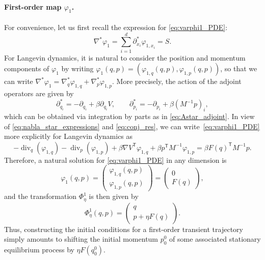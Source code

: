 \documentclass[11pt]{article}
\renewcommand{\t}{\mathsf T}
\DeclareMathOperator{\Div}{div}
\theoremstyle{definition}
\let\oldparagraph=\paragraph
\renewcommand\paragraph[1]{\oldparagraph{#1.}}
\begin{document}
\paragraph{First-order map $\varphi_1$} For convenience, let us first recall the expression for \eqref{eq:varphi1_PDE}: \begin{equation}
	\nabla^*\varphi_1 = \sum_{i=1}^d \partial_{x_i}^* \varphi_{1,x_i} = S.
 \end{equation}
For Langevin dynamics, it is natural to consider the position and momentum components of $\varphi_1$ by writing $\varphi_1(q,p) = (\varphi_{1,q}(q,p), \varphi_{1,p}(q,p))$, so that we can write $\nabla^*\varphi_1 = \nabla^*_q\varphi_{1,q} + \nabla^*_p\varphi_{1,p}$. More precisely, the action of the adjoint operators are given by
\begin{equation}
	\partial^*_{q_i} = - \partial_{q_i} + \beta\partial_{q_i} V , \qquad \partial^*_{p_i} = - \partial_{p_i} + \beta (M^{-1}p)_i,
	\label{eq:nabla_star_expressions}
\end{equation}
which can be obtained via integration by parts as in \eqref{eq:Astar_adjoint}. In view of \eqref{eq:nabla_star_expressions} and \eqref{eq:conj_res}, we can write~\eqref{eq:varphi1_PDE} more explicitly for Langevin dynamics as
\begin{equation}
	-\Div_q(\varphi_{1,q}) - \Div_p(\varphi_{1,p}) + \beta \nabla V^\t \varphi_{1,q} + \beta p^\t M^{-1} \varphi_{1,p} = \beta F(q)^\t M^{-1} p.
\end{equation}
Therefore, a natural solution for \eqref{eq:varphi1_PDE} in any dimension is
\begin{equation}
	\varphi_1(q,p) = \begin{pmatrix}
 	\varphi_{1,q}(q,p) \\ \varphi_{1,p}(q,p)
 	\end{pmatrix} =
	\begin{pmatrix}
 	0 \\ F(q)
 	\end{pmatrix},
 	\label{eq:varphi1_sol}
\end{equation}
and the transformation $\Phi^1_\eta$ is then given by
\begin{equation}
	\Phi_\eta^1(q,p) = 
	\begin{pmatrix}
 	  q \\ p + \eta F(q)
 	\end{pmatrix}.
  \label{eq:Phi1_map}
\end{equation}
Thus, constructing the initial conditions for a first-order transient trajectory simply amounts to shifting the initial momentum $p_0^0$ of some associated stationary equilibrium process by $\eta F(q_0^0)$.
\end{document}

